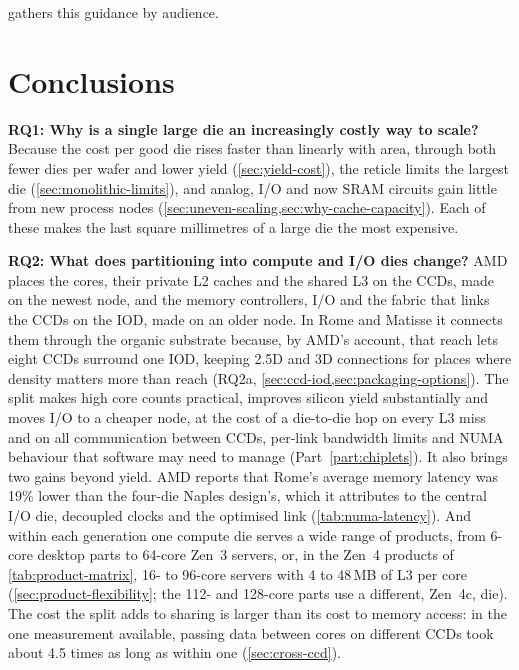  gathers this guidance by audience.



\section{Conclusions}
\label{sec:conclusions}
\textbf{RQ1: Why is a single large die an increasingly costly way to scale?} Because the cost per good die rises faster than linearly with area, through both fewer dies per wafer and lower yield (\cref{sec:yield-cost}), the reticle limits the largest die (\cref{sec:monolithic-limits}), and analog, I/O and now SRAM circuits gain little from new process nodes (\cref{sec:uneven-scaling,sec:why-cache-capacity}). Each of these makes the last square millimetres of a large die the most expensive.

\textbf{RQ2: What does partitioning into compute and I/O dies change?} AMD places the cores, their private L2 caches and the shared L3 on the CCDs, made on the newest node, and the memory controllers, I/O and the fabric that links the CCDs on the IOD, made on an older node. In Rome and Matisse it connects them through the organic substrate because, by AMD's account, that reach lets eight CCDs surround one IOD, keeping 2.5D and 3D connections for places where density matters more than reach (RQ2a, \cref{sec:ccd-iod,sec:packaging-options}). The split makes high core counts practical, improves silicon yield substantially and moves I/O to a cheaper node, at the cost of a die-to-die hop on every L3 miss and on all communication between CCDs, per-link bandwidth limits and NUMA behaviour that software may need to manage (Part~\ref{part:chiplets}). It also brings two gains beyond yield. AMD reports that Rome's average memory latency was 19\% lower than the four-die Naples design's, which it attributes to the central I/O die, decoupled clocks and the optimised link (\cref{tab:numa-latency}). And within each generation one compute die serves a wide range of products, from 6-core desktop parts to 64-core Zen~3 servers, or, in the Zen~4 products of \cref{tab:product-matrix}, 16- to 96-core servers with 4 to 48\,MB of L3 per core (\cref{sec:product-flexibility}; the 112- and 128-core parts use a different, Zen~4c, die). The cost the split adds to sharing is larger than its cost to memory access: in the one measurement available, passing data between cores on different CCDs took about 4.5 times as long as within one (\cref{sec:cross-ccd}). 

